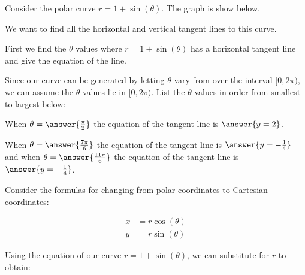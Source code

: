 \documentclass{ximera}
\author{Jason Miller}
\begin{document}
\begin{exercise}


Consider the polar curve $r=1+\sin(\theta)$. The graph is show below. 




\begin{image}  
\end{image} 

We want to find all the horizontal and vertical tangent lines to this curve.

First we find the $\theta$ values where $r=1+\sin(\theta)$ has a horizontal tangent line and give the equation of the line. 

Since our curve can be generated by letting $\theta$ vary from over the interval $[0, 2\pi)$, we can assume the $\theta$ values lie in $[0, 2\pi)$. List the $\theta$ values in order from smallest to largest below: 


When $\theta=\answer{\frac{\pi}{2}}$ the equation of the tangent line is $\answer{y=2  }$.

When $\theta=\answer{\frac{7\pi}{6}}$ the equation of the tangent line is $\answer{y=-\frac{1}{4}}$ and when $\theta=\answer{ \frac{11\pi}{6}}$ the equation of 
the tangent line is $\answer{ y=-\frac{1}{4}}$. 




\begin{hint}

Consider the formulas for changing from polar coordinates to Cartesian coordinates:

\begin{align*}
x&=r\cos(\theta) \\
y&=r\sin(\theta)
\end{align*}

Using the equation of our curve $r=1+\sin(\theta)$, we can substitute for $r$ to obtain:


\end{hint}
\end{exercise}
\end{document}
